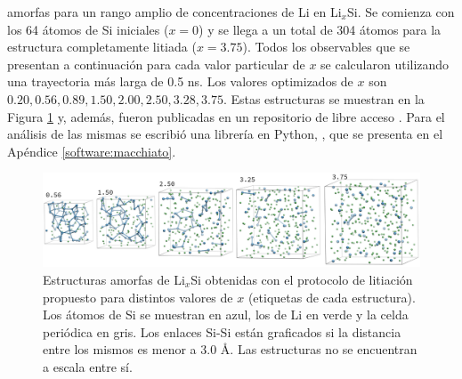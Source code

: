 amorfas para un rango amplio de concentraciones de Li en Li$_x$Si. Se comienza
con los 64 átomos de Si iniciales ($x=0$) y se llega a un total de 304 átomos
para la estructura completamente litiada ($x=3.75$). Todos los observables que
se presentan a continuación para cada valor particular de $x$ se calcularon 
utilizando una trayectoria más larga de 0.5 ns. Los valores optimizados de $x$
son $0.20, 0.56, 0.89, 1.50, 2.00, 2.50, 3.28, 3.75$. Estas estructuras se 
muestran en la Figura \ref{fig:litiacion} y, además, fueron publicadas en un 
repositorio de libre acceso \cite{dftb_lisi_amorphous}. Para el análisis de las 
mismas se escribió una librería en Python, , que se presenta en 
el Apéndice \ref{software:macchiato}.
\begin{figure}[h!]
    \centering
    \includegraphics[width=\textwidth]{Silicio/prediccion/metodos/litiacion.png}
    \caption{Estructuras amorfas de Li$_x$Si obtenidas con el protocolo de litiación
    propuesto para distintos valores de $x$ (etiquetas de cada estructura). Los 
    átomos de Si se muestran en azul, los de Li en verde y la celda periódica en 
    gris. Los enlaces Si-Si están graficados si la distancia entre los mismos es
    menor a 3.0 \AA. Las estructuras no se encuentran a escala entre sí.}
    \label{fig:litiacion}
\end{figure}
